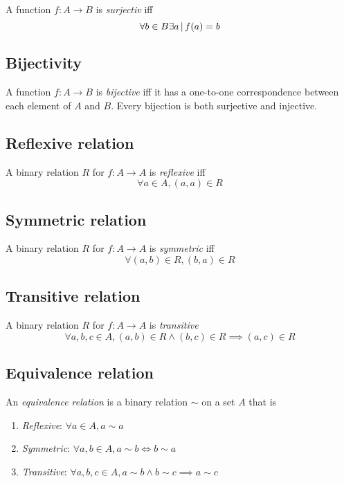 \documentclass{article}
\begin{document}
A function \(f:A\to B\) is \textit{surjectiv} iff
\[
    \forall b \in B \exists a \,|\, f(a)=b
\]

\subsection{Bijectivity}

A function \(f:A\to B\) is \textit{bijective} iff
it has a one-to-one correspondence between each element of \(A\) and  \(B\).
Every bijection is both surjective and injective.

\subsection{Reflexive relation}

A binary relation \(R\) for \(f:A\to A\) is \textit{reflexive}
iff
\[
    \forall a\in A, (a,a) \in R
\]

\subsection{Symmetric relation}

A binary relation \(R\) for \(f:A\to A\) is \textit{symmetric}
iff
\[
    \forall (a,b) \in R, (b,a) \in R
\]

\subsection{Transitive relation}

A binary relation \(R\) for \(f:A\to A\) is \textit{transitive}
\[
    \forall a,b,c \in A, (a,b) \in R \land (b,c) \in R \implies (a,c) \in R 
\]

\subsection{Equivalence relation}

An \textit{equivalence relation} is a binary relation \(\sim\) on a set \(A\)
that is
\begin{enumerate}
    \item \textit{Reflexive}: \(\forall a \in A, a \sim a\)
    \item \textit{Symmetric}: \(\forall a,b \in A, a \sim b \iff b \sim a\)
    \item \textit{Transitive}: \(\forall a,b,c \in A, a \sim b \land b \sim c \implies a \sim c\)
\end{enumerate}
\end{document}
